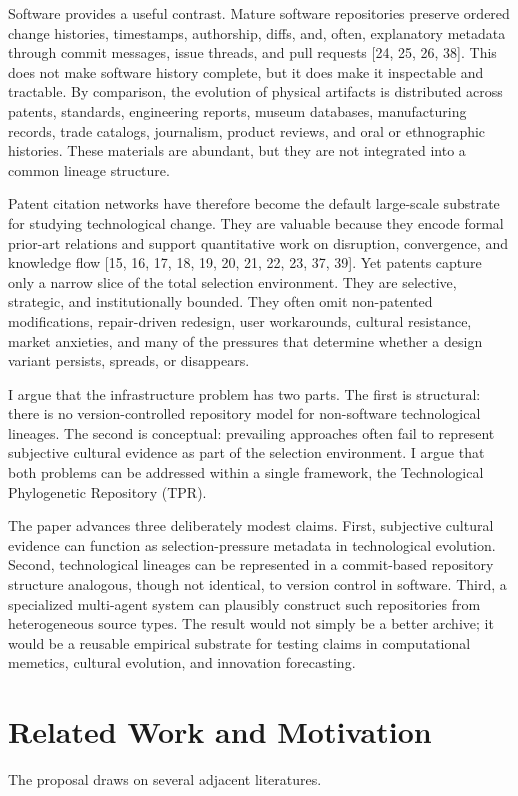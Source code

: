 \documentclass[11pt]{article}
\begin{document}
Software provides a useful contrast. Mature software repositories preserve ordered change histories, timestamps, authorship, diffs, and, often, explanatory metadata through commit messages, issue threads, and pull requests [24, 25, 26, 38]. This does not make software history complete, but it does make it inspectable and tractable. By comparison, the evolution of physical artifacts is distributed across patents, standards, engineering reports, museum databases, manufacturing records, trade catalogs, journalism, product reviews, and oral or ethnographic histories. These materials are abundant, but they are not integrated into a common lineage structure.

Patent citation networks have therefore become the default large-scale substrate for studying technological change. They are valuable because they encode formal prior-art relations and support quantitative work on disruption, convergence, and knowledge flow [15, 16, 17, 18, 19, 20, 21, 22, 23, 37, 39]. Yet patents capture only a narrow slice of the total selection environment. They are selective, strategic, and institutionally bounded. They often omit non-patented modifications, repair-driven redesign, user workarounds, cultural resistance, market anxieties, and many of the pressures that determine whether a design variant persists, spreads, or disappears.

I argue that the infrastructure problem has two parts. The first is structural: there is no version-controlled repository model for non-software technological lineages. The second is conceptual: prevailing approaches often fail to represent subjective cultural evidence as part of the selection environment. I argue that both problems can be addressed within a single framework, the Technological Phylogenetic Repository (TPR).

The paper advances three deliberately modest claims. First, subjective cultural evidence can function as selection-pressure metadata in technological evolution. Second, technological lineages can be represented in a commit-based repository structure analogous, though not identical, to version control in software. Third, a specialized multi-agent system can plausibly construct such repositories from heterogeneous source types. The result would not simply be a better archive; it would be a reusable empirical substrate for testing claims in computational memetics, cultural evolution, and innovation forecasting.

\section{Related Work and Motivation}
The proposal draws on several adjacent literatures.
\end{document}
